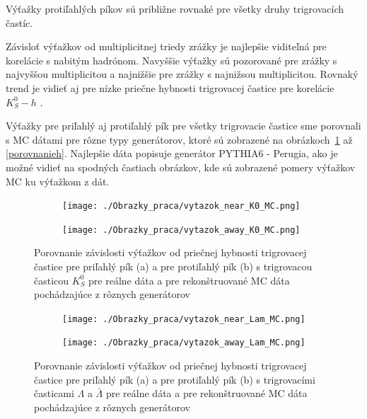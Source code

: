 \documentclass[thesismargins, thesislinespacing]{rnthesis}
\begin{document}
Výťažky protiľahlých píkov sú približne rovnaké pre všetky druhy trigrovacích častíc.

Závisloť výťažkov od multiplicitnej triedy zrážky je najlepšie viditeľná pre korelácie s nabitým hadrónom. Navyššie výťažky sú pozorované pre zrážky s najvyššou multiplicitou a najnižšie pre zrážky s najnižsou multiplicitou. Rovnaký trend je vidieť aj pre nízke priečne hybnosti trigrovacej častice pre korelácie  $K^0_S-h$ . 
  

Výťažky pre priľahlý aj protiľahlý pík pre všetky trigrovacie častice sme porovnali s MC dátami pre rôzne typy generátorov, ktoré sú zobrazené na obrázkoch~\ref{porovnanie} až \ref{porovnanieh}. Najlepšie dáta popisuje generátor PYTHIA6 - Perugia, ako je možné vidieť na spodných častiach obrázkov, kde sú zobrazené pomery výťažkov MC ku výťažkom z dát.

\begin{figure}[hbtp!]
	\centering
	\begin{subfigure}{0.5\textwidth}
		\centering
		\texttt{[image: ./Obrazky\_praca/vytazok\_near\_K0\_MC.png]}
		\caption{}
	\end{subfigure}%
	\begin{subfigure}{0.5\textwidth}
		\centering
		\texttt{[image: ./Obrazky\_praca/vytazok\_away\_K0\_MC.png]}
		\caption{}
	\end{subfigure}
	\caption{Porovnanie závislosti výťažkov od priečnej hybnosti trigrovacej častice pre priľahlý pík (a) a pre protiľahlý pík (b) s trigrovacou časticou $K^0_S$ pre reálne dáta a pre rekonštruované MC dáta pochádzajúce z rôznych generátorov}
	\label{porovnanie}
\end{figure}

\begin{figure}[hbtp!]
	\centering
\begin{subfigure}{0.5\textwidth}
	\centering
	\texttt{[image: ./Obrazky\_praca/vytazok\_near\_Lam\_MC.png]}
	\caption{}
\end{subfigure}%
\begin{subfigure}{0.5\textwidth}
	\centering
	\texttt{[image: ./Obrazky\_praca/vytazok\_away\_Lam\_MC.png]}
	\caption{}
\end{subfigure}
	\caption{Porovnanie závislosti výťažkov od priečnej hybnosti trigrovacej častice pre priľahlý pík (a) a pre protiľahlý pík (b) s trigrovacími časticami $\Lambda$ a $\bar{\Lambda}$ pre reálne dáta a pre rekonštruované MC dáta pochádzajúce z rôznych generátorov}
	\label{porovnanieL}
\end{figure}
\end{document}
